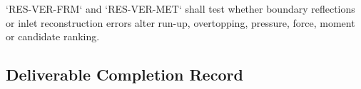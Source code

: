 `RES-VER-FRM` and `RES-VER-MET` shall test whether boundary reflections
or inlet reconstruction errors alter run-up, overtopping, pressure,
force, moment or candidate ranking.

\subsection{Deliverable Completion Record}
\label{sec:res-mod-ibc-completion-record}

%
%
%

